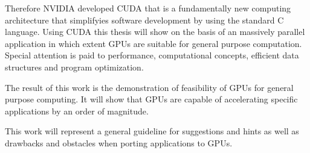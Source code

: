 
Therefore NVIDIA developed \gls{CUDA} that is a fundamentally new computing 
architecture that simplifyies software development by using the standard C 
language. Using \gls{CUDA} this thesis will show on the basis of an massively parallel 
application in which extent \glspl{GPU} are suitable for general purpose computation. 
Special attention is paid to performance, computational concepts, efficient data 
structures and program optimization. 

The result of this work is the demonstration of feasibility of \glspl{GPU} for
general purpose computing. It will show that \glspl{GPU} are capable of
accelerating specific applications by an order of magnitude.

This work will represent a general guideline for suggestions and hints as 
well as drawbacks and obstacles when porting applications to GPUs.

\endgroup			

\vfill